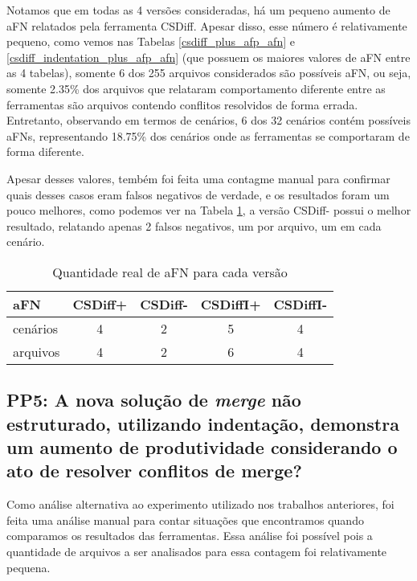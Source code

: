 Notamos que em todas as 4 versões consideradas, há um pequeno aumento de aFN relatados pela ferramenta CSDiff. Apesar disso, esse
número é relativamente pequeno, como vemos nas Tabelas \ref{csdiff_plus_afp_afn} e \ref{csdiff_indentation_plus_afp_afn} (que
possuem os maiores valores de aFN entre as 4 tabelas), somente 6 dos 255 arquivos considerados são possíveis aFN, ou seja, somente
2.35\% dos arquivos que relataram comportamento diferente entre as ferramentas são arquivos contendo
conflitos resolvidos de forma errada. Entretanto, observando em termos de cenários, 6 dos 32 cenários contém possíveis aFNs,
representando 18.75\% dos cenários onde as ferramentas se comportaram de forma diferente.

Apesar desses valores, tembém foi feita uma contagme manual para confirmar quais desses casos eram falsos negativos de verdade,
e os resultados foram um pouco melhores, como podemos ver na Tabela \ref{tabela_afn_final}, a versão CSDiff- possui o melhor
resultado, relatando apenas 2 falsos negativos, um por arquivo, um em cada cenário.
\begin{table}[ht]
	\begin{center}
		\begin{tabular}{|l|c|c|c|c|}
			\hline
			\textbf{aFN} & \textbf{CSDiff+} & \textbf{CSDiff-} & \textbf{CSDiffI+} & \textbf{CSDiffI-} \\
			\hline
			cenários     & 4                & 2                & 5                 & 4                 \\
			arquivos     & 4                & 2                & 6                 & 4                 \\
			\hline
		\end{tabular}
	\end{center}
	\caption{Quantidade real de aFN para cada versão}\label{tabela_afn_final}
\end{table}
\subsection{PP5: A nova solução de \emph{merge} não estruturado, utilizando indentação,
	demonstra um aumento de produtividade considerando o ato de resolver conflitos de merge?}
Como análise alternativa ao experimento utilizado nos trabalhos anteriores, foi feita uma análise manual para contar
situações que encontramos quando comparamos os resultados das ferramentas. Essa análise foi possível pois a quantidade de
arquivos a ser analisados para essa contagem foi relativamente pequena.

